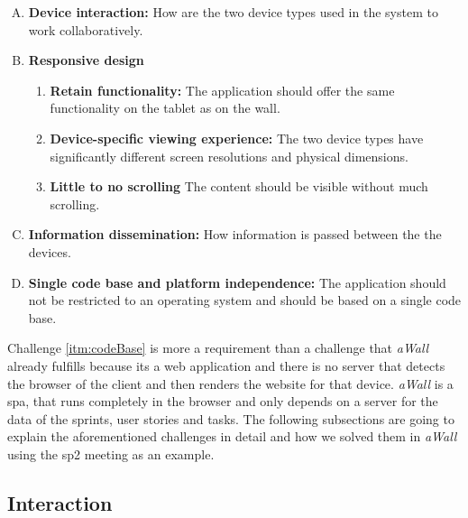 \documentclass{sigchi}
\begin{document}
\begin{enumerate}[A.]
	\item \textbf{Device interaction:} How are  the two device types used in the system to work collaboratively.~\label{itm:interaction}
	
	\item \textbf{Responsive design}
	\begin{enumerate}[1.]
			\item \textbf{Retain functionality:} The application should offer the same functionality on the tablet as on the wall.~\label{itm:retainFunc}
					
			\item \textbf{Device-specific viewing experience:} The two device types have significantly different screen resolutions and physical dimensions.~\label{itm:rwdViewingExp}
			
			\item \textbf{Little to no scrolling} The content should be visible without much scrolling.~\label{itm:scrolling}
	\end{enumerate}

	\item \textbf{Information dissemination:} How information is passed between the the devices.~\label{itm:information}
	
	\item \textbf{Single code base and platform independence:} The application should not be restricted to an operating system and should be based on a single code base.~\label{itm:codeBase}
\end{enumerate}

Challenge \ref{itm:codeBase} is more a requirement than a challenge that \textit{aWall} already fulfills because its a web application and there is no server that detects the browser of the client and then renders the website for that device.
\textit{aWall} is a \gls{spa}, that runs completely in the browser and only depends on a server for the data of the sprints, user stories and tasks.
The following subsections are going to explain the aforementioned challenges in detail and how we solved them in \textit{aWall} using the \gls{sp2} meeting as an example.


\subsection{Interaction}
\end{document}
